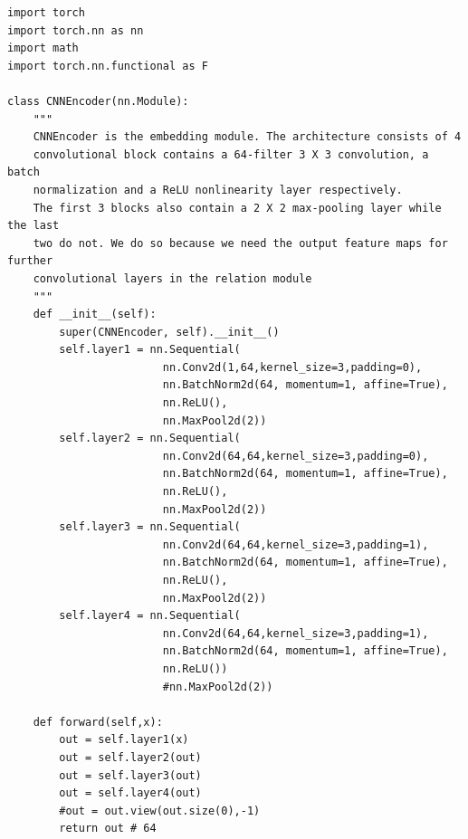 \documentclass[12pt,a4paper,titlepage]{article}
\begin{document}
\begin{lstlisting}[language=iPython,firstnumber=1, caption=relation\_network.py, label=relation network,captionpos=b]
import torch
import torch.nn as nn
import math
import torch.nn.functional as F

class CNNEncoder(nn.Module):
    """
    CNNEncoder is the embedding module. The architecture consists of 4 
    convolutional block contains a 64-filter 3 X 3 convolution, a batch 
    normalization and a ReLU nonlinearity layer respectively. 
    The first 3 blocks also contain a 2 X 2 max-pooling layer while the last 
    two do not. We do so because we need the output feature maps for further
    convolutional layers in the relation module
    """
    def __init__(self):
        super(CNNEncoder, self).__init__()
        self.layer1 = nn.Sequential(
                        nn.Conv2d(1,64,kernel_size=3,padding=0),
                        nn.BatchNorm2d(64, momentum=1, affine=True),
                        nn.ReLU(),
                        nn.MaxPool2d(2))
        self.layer2 = nn.Sequential(
                        nn.Conv2d(64,64,kernel_size=3,padding=0),
                        nn.BatchNorm2d(64, momentum=1, affine=True),
                        nn.ReLU(),
                        nn.MaxPool2d(2))
        self.layer3 = nn.Sequential(
                        nn.Conv2d(64,64,kernel_size=3,padding=1),
                        nn.BatchNorm2d(64, momentum=1, affine=True),
                        nn.ReLU(),
                        nn.MaxPool2d(2))
        self.layer4 = nn.Sequential(
                        nn.Conv2d(64,64,kernel_size=3,padding=1),
                        nn.BatchNorm2d(64, momentum=1, affine=True),
                        nn.ReLU())
                        #nn.MaxPool2d(2))

    def forward(self,x):
        out = self.layer1(x)
        out = self.layer2(out)
        out = self.layer3(out)
        out = self.layer4(out)
        #out = out.view(out.size(0),-1)
        return out # 64


\end{lstlisting}
\end{document}
